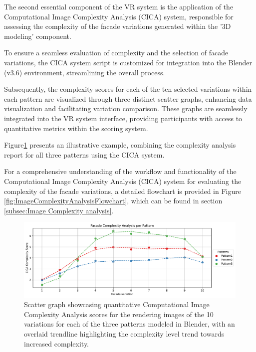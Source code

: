 %    

The second essential component of the VR system is the application of the Computational Image Complexity Analysis (CICA) system, responsible for assessing the complexity of the facade variations generated within the '3D modeling' component.

To ensure a seamless evaluation of complexity and the selection of facade variations, the CICA system script is customized for integration into the Blender (v3.6) environment, streamlining the overall process.

Subsequently, the complexity scores for each of the ten selected variations within each pattern are visualized through three distinct scatter graphs, enhancing data visualization and facilitating variation comparison.
These graphs are seamlessly integrated into the VR system interface, providing participants with access to quantitative metrics within the scoring system.

Figure\ref{fig:complexitygraphRender} presents an illustrative example, combining the complexity analysis report for all three patterns using the CICA system.

For a comprehensive understanding of the workflow and functionality of the Computational Image Complexity Analysis (CICA) system for evaluating the complexity of the facade variations, a detailed flowchart is provided in Figure \ref{fig:ImageComplexityAnalysisFlowchart}, which can be found in section \ref{subsec:Image Complexity analysis}.

     \begin{figure}[!htb]
          \centering
          \includegraphics[width= \linewidth]{Graphs/complexitygraphrender}
          \caption{Scatter graph showcasing quantitative Computational Image Complexity Analysis scores for the rendering images of the 10 variations for each of the three patterns modeled in Blender, with an overlaid trendline highlighting the complexity level trend towards increased complexity.}
          \label{fig:complexitygraphRender}
        \end{figure}